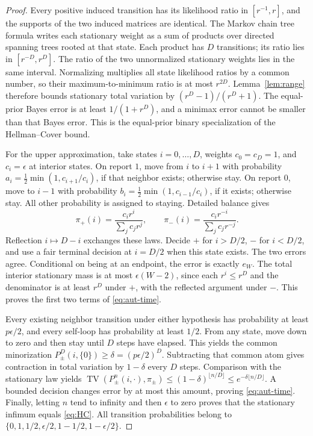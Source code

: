 \documentclass[11pt]{amsart}
\theoremstyle{definition}\newtheorem{definition}[theorem]{Definition}
\theoremstyle{remark}\newtheorem{remark}[theorem]{Remark}
\newcommand{\TV}{\operatorname{TV}}
\newcommand{\1}{\mathbf 1}
\begin{document}
\begin{proof}
Every positive induced transition has its likelihood ratio in
$[r^{-1},r]$, and the supports of the two induced matrices are identical.
The Markov chain tree formula writes each stationary weight as a sum of
products over directed spanning trees rooted at that state. Each product
has $D$ transitions; its ratio lies in $[r^{-D},r^D]$. The ratio of the
two unnormalized stationary weights lies in the same interval. Normalizing
multiplies all state likelihood ratios by a common number, so their
maximum-to-minimum ratio is at most $r^{2D}$. Lemma~\ref{lem:range}
therefore bounds stationary total variation by $(r^D-1)/(r^D+1)$.
The equal-prior Bayes error is at least $1/(1+r^D)$, and a minimax error
cannot be smaller than that Bayes error. This is the equal-prior binary
specialization of the Hellman--Cover bound.

For the upper approximation, take states $i=0,\ldots,D$, weights
$c_0=c_D=1$, and $c_i=\epsilon$ at interior states. On report $1$, move
from $i$ to $i+1$ with probability
$a_i=\frac12\min(1,c_{i+1}/c_i)$, if that neighbor exists; otherwise
stay. On report $0$, move to $i-1$ with probability
$b_i=\frac12\min(1,c_{i-1}/c_i)$, if it exists; otherwise stay.
All other probability is assigned to staying. Detailed balance gives
\[
 \pi_+(i)=\frac{c_ir^i}{\sum_jc_jr^j},\qquad
 \pi_-(i)=\frac{c_ir^{-i}}{\sum_jc_jr^{-j}}.
\]
Reflection $i\mapsto D-i$ exchanges these laws. Decide $+$ for $i>D/2$,
$-$ for $i<D/2$, and use a fair terminal decision at $i=D/2$ when this
state exists. The two errors agree. Conditional on being at an endpoint,
the error is exactly $e_W$. The total interior stationary mass is at most
$\epsilon(W-2)$, since each $r^i\le r^D$ and the denominator is at
least $r^D$ under $+$, with the reflected argument under $-$.
This proves the first two terms of \eqref{eq:aut-time}.

Every existing neighbor transition under either hypothesis has probability
at least $p\epsilon/2$, and every self-loop has probability at least
$1/2$. From any state, move down to zero and then stay until $D$ steps
have elapsed. This yields the common minorization
$P_\pm^D(i,\{0\})\ge\delta=(p\epsilon/2)^D$.
Subtracting that common atom gives contraction in total variation by
$1-\delta$ every $D$ steps. Comparison with the stationary law yields
$\TV(P_\pm^n(i,\cdot),\pi_\pm)\le
(1-\delta)^{\lfloor n/D\rfloor}\le e^{-\delta\lfloor n/D\rfloor}$.
A bounded decision changes error by at most this amount, proving
\eqref{eq:aut-time}. Finally, letting $n$ tend to infinity and then
$\epsilon$ to zero proves that the stationary infimum equals
\eqref{eq:HC}. All transition probabilities belong to
$\{0,1,1/2,\epsilon/2,1-1/2,1-\epsilon/2\}$.
\end{proof}
\end{document}
